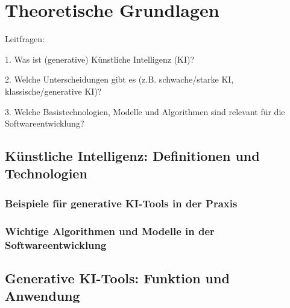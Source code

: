 \chapter{Theoretische Grundlagen}
Leitfragen:

1. Was ist (generative) Künstliche Intelligenz (KI)?

2. Welche Unterscheidungen gibt es (z.B. schwache/starke KI, klassische/generative KI)?

3. Welche Basistechnologien, Modelle und Algorithmen sind relevant für die Softwareentwicklung?

\section{Künstliche Intelligenz: Definitionen und Technologien}


\subsection{Beispiele für generative KI-Tools in der Praxis}


\subsection{Wichtige Algorithmen und Modelle in der Softwareentwicklung}


\section{Generative KI-Tools: Funktion und Anwendung}


